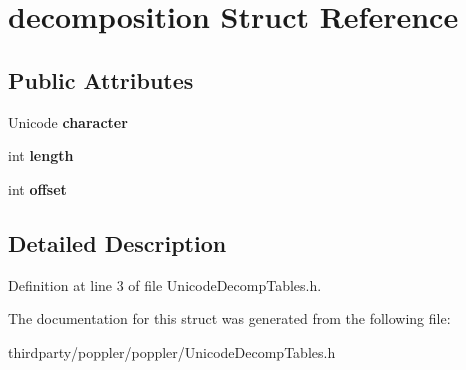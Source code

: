 \hypertarget{structdecomposition}{}\section{decomposition Struct Reference}
\label{structdecomposition}
\subsection*{Public Attributes}
\begin{DoxyCompactItemize}
\item 
\mbox{\label{structdecomposition_ada3b0c124611e53da1814530e0015890}} 
Unicode {\bfseries character}
\item 
\mbox{\label{structdecomposition_af67737eba69300de7d077d40c3918da9}} 
int {\bfseries length}
\item 
\mbox{\label{structdecomposition_a0a1278849fa0d61fb9a68d0a3fb4b396}} 
int {\bfseries offset}
\end{DoxyCompactItemize}


\subsection{Detailed Description}


Definition at line 3 of file Unicode\+Decomp\+Tables.\+h.



The documentation for this struct was generated from the following file\+:\begin{DoxyCompactItemize}
\item 
thirdparty/poppler/poppler/Unicode\+Decomp\+Tables.\+h\end{DoxyCompactItemize}
